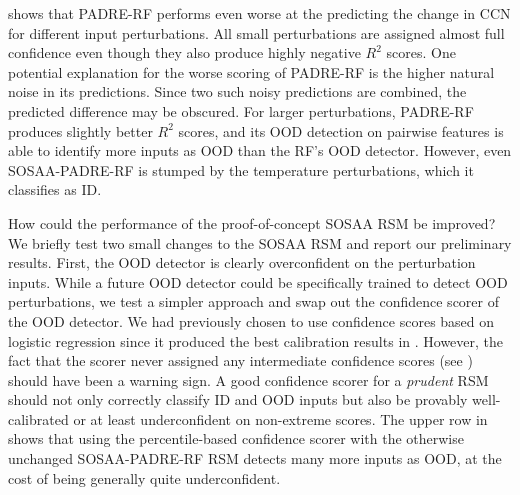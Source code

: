 \noindent {} shows that PADRE-RF performs even worse at the predicting the change in CCN for different input perturbations. All small perturbations are assigned almost full confidence even though they also produce highly negative $R^2$ scores. One potential explanation for the worse scoring of PADRE-RF is the higher natural noise in its predictions. Since two such noisy predictions are combined, the predicted difference may be obscured. For larger perturbations, PADRE-RF produces slightly better $R^2$ scores, and its OOD detection on pairwise features is able to identify more inputs as OOD than the RF's OOD detector. However, even SOSAA-PADRE-RF is stumped by the temperature perturbations, which it classifies as ID.

\newpar How could the performance of the proof-of-concept SOSAA RSM be improved? We briefly test two small changes to the SOSAA RSM and report our preliminary results. First, the OOD detector is clearly overconfident on the perturbation inputs. While a future OOD detector could be specifically trained to detect OOD perturbations, we test a simpler approach and swap out the confidence scorer of the OOD detector. We had previously chosen to use confidence scores based on logistic regression since it produced the best calibration results in . However, the fact that the scorer never assigned any intermediate confidence scores (see ) should have been a warning sign. A good confidence scorer for a \textit{prudent} RSM should not only correctly classify ID and OOD inputs but also be provably well-calibrated or at least underconfident on non-extreme scores. The upper row in  shows that using the percentile-based confidence scorer with the otherwise unchanged SOSAA-PADRE-RF RSM detects many more inputs as OOD, at the cost of being generally quite underconfident.

